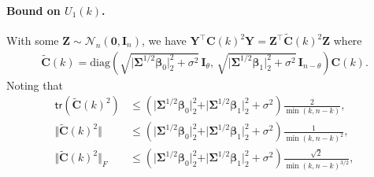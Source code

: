 \documentclass[11pt, a4paper]{article}
\newcommand{\mbf}{\mathbf}
\newcommand{\mc}{\mathcal}
\renewcommand{\l}{\left}
\renewcommand{\r}{\right}
\def\wt{\widetilde}
\newcommand{\cp}{\theta}
\newcommand{\tr}[0]{\mathsf{tr}}
\theoremstyle{definition}
\theoremstyle{definition}
\theoremstyle{definition}
\theoremstyle{definition}
\theoremstyle{definition}
\theoremstyle{remark}
\theoremstyle{definition}
\theoremstyle{definition}
\theoremstyle{definition}
\begin{document}
\paragraph{Bound on $U_1(k)$.} With some $\mbf Z \sim \mc N_n(\mbf 0, \mbf I_n)$, we have $\mbf Y^\top \mbf C(k)^2 \mbf Y = \mbf Z^\top \wt{\mbf C}(k)^2 \mbf Z$ where
\begin{align*}
\wt{\mbf C}(k) = \text{diag}\l( \sqrt{ \vert \bm\Sigma^{1/2} \bm\beta_0 \vert_2^2 + \sigma^2 } \, \mbf I_\cp, \, \sqrt{ \vert \bm\Sigma^{1/2} \bm\beta_1 \vert_2^2 + \sigma^2} \, \mbf I_{n - \cp} \r) \mbf C(k).
\end{align*}
Noting that
\begin{align*}
\tr(\wt{\mbf C}(k)^2) &\le (\vert \bm\Sigma^{1/2} \bm\beta_0 \vert_2^2 + \vert \bm\Sigma^{1/2} \bm\beta_1 \vert_2^2 + \sigma^2) \frac{2}{\min(k, n - k)},
\\
\Vert \wt{\mbf C}(k)^2 \Vert &\le (\vert \bm\Sigma^{1/2} \bm\beta_0 \vert_2^2 + \vert \bm\Sigma^{1/2} \bm\beta_1 \vert_2^2 + \sigma^2) \frac{1}{\min(k, n - k)^2},
\\
\Vert \wt{\mbf C}(k)^2 \Vert_F &\le (\vert \bm\Sigma^{1/2} \bm\beta_0 \vert_2^2 + \vert \bm\Sigma^{1/2} \bm\beta_1 \vert_2^2 + \sigma^2) \frac{\sqrt{2}}{\min(k, n - k)^{3/2}},
\end{align*}
\end{document}
